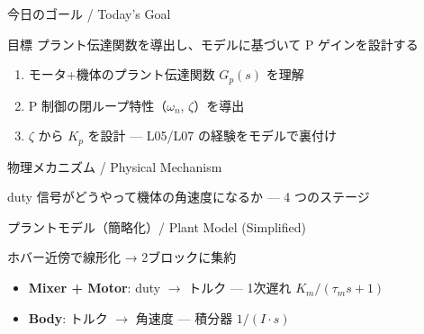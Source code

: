 \documentclass[aspectratio=169, 14pt]{beamer}
\begin{document}
\begin{frame}
  \titlepage
\end{frame}

\begin{frame}{今日のゴール / Today's Goal}
  \begin{block}{目標}
    プラント伝達関数を導出し、モデルに基づいて P ゲインを設計する
  \end{block}

  \vspace{1em}

  \begin{enumerate}
    \item モータ+機体のプラント伝達関数 $G_p(s)$ を理解
    \item P 制御の閉ループ特性（$\omega_n$, $\zeta$）を導出
    \item $\zeta$ から $K_p$ を設計 --- L05/L07 の経験をモデルで裏付け
  \end{enumerate}
\end{frame}

\begin{frame}{物理メカニズム / Physical Mechanism}
  \begin{center}
    \vspace{-2mm}
    \resizebox{0.95\textwidth}{!}{}
  \end{center}

  \vspace{-0.5em}

  {\small duty 信号がどうやって機体の角速度になるか --- 4 つのステージ}
\end{frame}

\begin{frame}{プラントモデル（簡略化）/ Plant Model (Simplified)}
  \begin{center}
    \vspace{-2mm}
    \resizebox{0.85\textwidth}{!}{}
  \end{center}

  \vspace{-0.5em}

  \begin{exampleblock}{ホバー近傍で線形化 → 2ブロックに集約}
    \begin{itemize}
      \item \textbf{Mixer + Motor}: duty $\to$ トルク
            --- 1次遅れ $K_m/(\tau_m s + 1)$
      \item \textbf{Body}: トルク $\to$ 角速度
            --- 積分器 $1/(I \cdot s)$
    \end{itemize}
  \end{exampleblock}
\end{frame}
\end{document}

